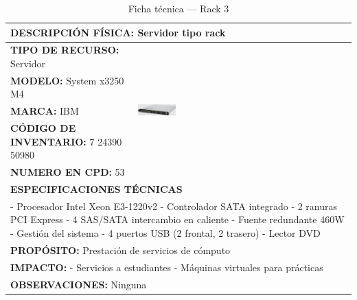 \begin{table}[H]
\centering
\sffamily\scriptsize
\setlength{\tabcolsep}{3pt}
\renewcommand{\arraystretch}{1.1}
\caption{Ficha técnica --- Rack 3}
\label{tab:rack-3}
\begin{tabular}{|p{}|p{}|}
\hline
\multicolumn{2}{|l|}{\textbf{DESCRIPCIÓN FÍSICA:} Servidor tipo rack} \\ \hline
\textbf{TIPO DE RECURSO:} Servidor & 
\multirow{5}{*}{\includegraphics[width=0.18\textwidth,keepaspectratio]{tablas-images/cp1/racks/rack-1.png}} \\ \cline{1-1}
\textbf{MODELO:} System x3250 M4 & \\ \cline{1-1}
\textbf{MARCA:} IBM & \\ \cline{1-1}
\textbf{CÓDIGO DE INVENTARIO:} 7 24390 50980 & \\ \cline{1-1}
\textbf{NUMERO EN CPD:} 53 & \\ \hline
\multicolumn{2}{|l|}{\textbf{ESPECIFICACIONES TÉCNICAS}} \\ \hline
\multicolumn{2}{|p{0.7\textwidth}|}{
- Procesador Intel Xeon E3-1220v2
- Controlador SATA integrado
- 2 ranuras PCI Express
- 4 SAS/SATA intercambio en caliente
- Fuente redundante 460W
- Gestión del sistema
- 4 puertos USB (2 frontal, 2 trasero)
- Lector DVD
} \\ \hline
\multicolumn{2}{|l|}{\textbf{PROPÓSITO:} Prestación de servicios de cómputo} \\ \hline
\multicolumn{2}{|p{0.7\textwidth}|}{\textbf{IMPACTO:} 
- Servicios a estudiantes
- Máquinas virtuales para prácticas} \\ \hline
\multicolumn{2}{|p{0.7\textwidth}|}{\textbf{OBSERVACIONES:} Ninguna} \\ \hline
\end{tabular}
\end{table}

